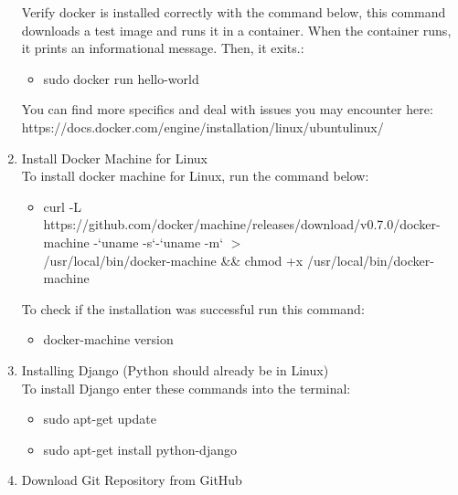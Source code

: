 \documentclass[draftclsnofoot,10pt,onecolumn]{IEEEtran} %
\begin{document}
\begin{enumerate}
	Verify docker is installed correctly with the command below, this command downloads a test image and runs it in a container. 
	When the container runs, it prints an informational message. Then, it exits.:
	
	\begin{itemize}
		\item sudo docker run hello-world \\
	\end{itemize}
	
	You can find more specifics and deal with issues you may encounter here: \\
	https://docs.docker.com/engine/installation/linux/ubuntulinux/ \\
	
	\item Install Docker Machine for Linux \\
	To install docker machine for Linux, run the command below:
	
	\begin{itemize}
		\item curl -L https://github.com/docker/machine/releases/download/v0.7.0/docker-machine -`uname -s`-`uname -m` 
		$>$ \\ /usr/local/bin/docker-machine \&\& chmod +x /usr/local/bin/docker-machine \\
	\end{itemize}
	
	To check if the installation was successful run this command:
	
	\begin{itemize}
		\item docker-machine version \\
	\end{itemize}
	
	\item Installing Django (Python should already be in Linux) \\
	
	To install Django enter these commands into the terminal:
	
	\begin{itemize}
		\item sudo apt-get update
		\item sudo apt-get install python-django \\
	\end{itemize}
	
	\item Download Git Repository from GitHub \\
	

\end{enumerate}
\end{document}
